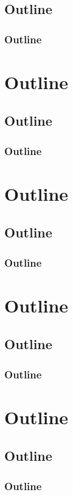 \documentclass[
    aspectratio=169
]{beamer}
\begin{document}
\subsection{Outline}
\begin{frame}
\frametitle{Outline}
\end{frame}
\section{Outline}
\subsection{Outline}
\begin{frame}
\frametitle{Outline}
\end{frame}
\section{Outline}
\subsection{Outline}
\begin{frame}
\frametitle{Outline}
\end{frame}
\section{Outline}
\subsection{Outline}
\begin{frame}
\frametitle{Outline}
\end{frame}
\section{Outline}
\subsection{Outline}
\begin{frame}
\frametitle{Outline}
\end{frame}
\end{document}
